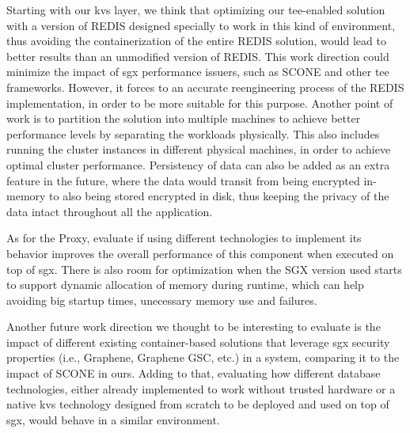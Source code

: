 Starting with our \gls{kvs} layer, we think that optimizing our \gls{tee}-enabled solution with a version of REDIS designed specially to work in this kind of environment, thus avoiding the containerization of the entire REDIS solution, would lead to better results than an unmodified version of REDIS. This work direction could minimize the impact of \gls{sgx} performance issuers, such as SCONE and other \gls{tee} frameworks. However, it forces to an accurate reengineering process of the REDIS implementation, in order to be more suitable for this purpose.
Another point of work is to partition the solution into multiple machines to achieve better performance levels by separating the workloads physically. This also includes running the cluster instances in different physical machines, in order to achieve optimal cluster performance.
Persistency of data can also be added as an extra feature in the future, where the data would transit from being encrypted in-memory to also being stored encrypted in disk, thus keeping the privacy of the data intact throughout all the application.

As for the Proxy, evaluate if using different technologies to implement its behavior improves the overall performance of this component when executed on top of \gls{sgx}.
There is also room for optimization when the SGX version used starts to support dynamic allocation of memory during runtime, which can help avoiding big startup times, unecessary memory use and failures.

Another future work direction we thought to be interesting to evaluate is the impact of different existing container-based solutions that leverage \gls{sgx} security properties (i.e., Graphene, Graphene GSC, etc.) in a system, comparing it to the impact of SCONE in ours. 
Adding to that, evaluating how different database technologies, either already implemented to work without trusted hardware or a native \gls{kvs} technology designed from scratch to be deployed and used on top of \gls{sgx}, would behave in a similar environment.
